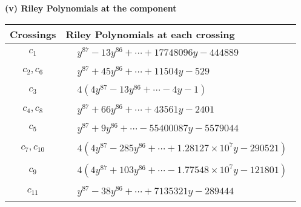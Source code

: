 \documentclass[1p]{elsarticle_modified}
\theoremstyle{definition}
\begin{document}
\newpage\renewcommand{\arraystretch}{1}
\flushleft \textbf{(v) Riley Polynomials at the component}\newline \\
\begin{tabular}{m{50pt}|m{274pt}}
Crossings & \hspace{64pt}Riley Polynomials at each crossing \\
\hline $$\begin{aligned}c_{1}\end{aligned}$$&$\begin{aligned}
&y^{87}-13 y^{86}+\cdots+17748096 y-444889
\end{aligned}$\\
\hline $$\begin{aligned}c_{2},c_{6}\end{aligned}$$&$\begin{aligned}
&y^{87}+45 y^{86}+\cdots+11504 y-529
\end{aligned}$\\
\hline $$\begin{aligned}c_{3}\end{aligned}$$&$\begin{aligned}
&4(4 y^{87}-13 y^{86}+\cdots-4 y-1)
\end{aligned}$\\
\hline $$\begin{aligned}c_{4},c_{8}\end{aligned}$$&$\begin{aligned}
&y^{87}+66 y^{86}+\cdots+43561 y-2401
\end{aligned}$\\
\hline $$\begin{aligned}c_{5}\end{aligned}$$&$\begin{aligned}
&y^{87}+9 y^{86}+\cdots-55400087 y-5579044
\end{aligned}$\\
\hline $$\begin{aligned}c_{7},c_{10}\end{aligned}$$&$\begin{aligned}
&4(4 y^{87}-285 y^{86}+\cdots+1.28127\times10^{7} y-290521)
\end{aligned}$\\
\hline $$\begin{aligned}c_{9}\end{aligned}$$&$\begin{aligned}
&4(4 y^{87}+103 y^{86}+\cdots-1.77548\times10^{7} y-121801)
\end{aligned}$\\
\hline $$\begin{aligned}c_{11}\end{aligned}$$&$\begin{aligned}
&y^{87}-38 y^{86}+\cdots+7135321 y-289444
\end{aligned}$\\
\hline
\end{tabular}\\~\\
\end{document}
